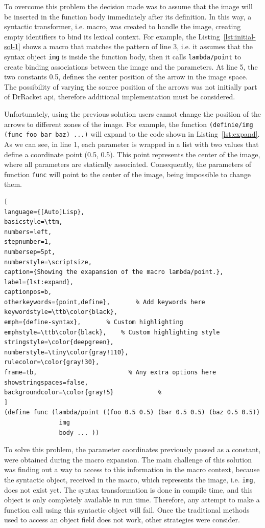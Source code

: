 To overcome this problem the decision made was to assume that the image will be inserted in the function body immediately after its definition. In this way, a syntactic transformer, i.e. macro, was created to handle the image, creating empty identifiers to bind its lexical context. For example, the Listing~\ref{lst:initial-sol-1} shows a macro that matches the pattern of line 3, i.e. it assumes that the syntax object \texttt{img} is inside the function body, then it calls \texttt{lambda/point} to create binding associations between the image and the parameters. At line 5, the two constants 0.5, defines the center position of the arrow in the image space. The possibility of varying the source position of the arrows was not initially part of DrRacket \gls{api}, therefore additional implementation must be considered.

Unfortunately, using the previous solution users cannot change the position of the arrows to different zones of the image. For example, the function \texttt{(definie/img (func foo bar baz) ...)} will expand to the code shown in Listing~\ref{lst:expand}. As we can see, in line 1, each parameter is wrapped in a list with two values that define a coordinate point (0.5, 0.5). This point represents the center of the image, where all parameters are statically associated. Consequently, the parameters of function \texttt{func} will point to the center of the image, being impossible to change them. \\

\begin{lstlisting}[
language={[Auto]Lisp},
basicstyle=\ttm,
numbers=left,
stepnumber=1,
numbersep=5pt,                   
numberstyle=\scriptsize, 
caption={Showing the exapansion of the macro lambda/point.},
label={lst:expand},
captionpos=b, 
otherkeywords={point,define},       % Add keywords here
keywordstyle=\ttb\color{black},
emph={define-syntax},       % Custom highlighting
emphstyle=\ttb\color{black},    % Custom highlighting style
stringstyle=\color{deepgreen},
numberstyle=\tiny\color{gray!110},
rulecolor=\color{gray!30},
frame=tb,                         % Any extra options here
showstringspaces=false,
backgroundcolor=\color{gray!5}            % 
]
(define func (lambda/point ((foo 0.5 0.5) (bar 0.5 0.5) (baz 0.5 0.5)) 
               img 
               body ... ))
\end{lstlisting}

To solve this problem, the parameter coordinates previously passed as a constant, were obtained during the macro expansion. The main challenge of this solution was finding out a way to access to this information in the macro context, because the syntactic object,  received in the macro, which represents the image, i.e. \texttt{img}, does not exist yet. The syntax transformation is done in compile time, and this object is only completely available in run time. Therefore, any attempt to make a function call using this syntactic object will fail. Once the traditional methods used to access an object field does not work, other strategies were consider. 

